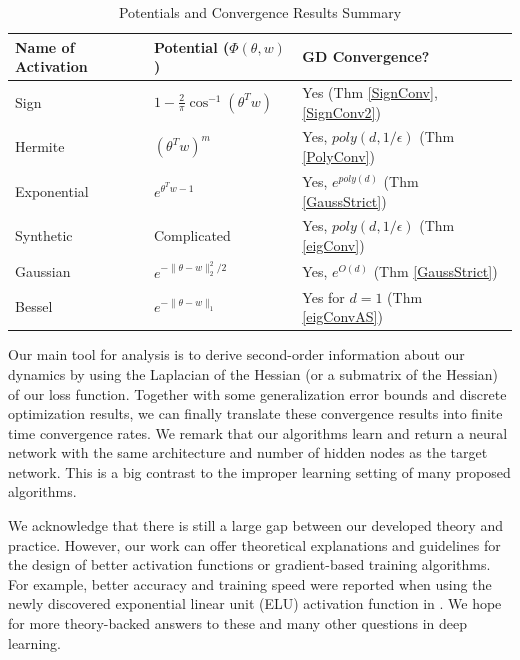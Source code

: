 \documentclass{article}
\begin{document}
\begin{table}[tb]
\caption{Potentials and Convergence Results Summary}
\label{table1}
\noindent
\vskip 0.1in
\begin{center}
\begin{small}
\begin{sc}
\begin{tabular}{
  |p{}%
  |p{}%
  |p{}|%
  }
   \hline 
        Name of Activation&  Potential  ($\Phi(\theta,w)$)    & GD Convergence? \\ \hline 
        Sign & $1 - \frac{2}{\pi}\cos^{-1}(\theta^Tw)$       & Yes (Thm \ref{SignConv}, \ref{SignConv2})\\ 
         Hermite   & $(\theta^Tw)^m$       & Yes, $poly(d,1/\epsilon)$ (Thm \ref{PolyConv}) \\        
        Exponential       & $e^{\theta^Tw-1}$       & Yes, $e^{poly(d)}$ (Thm \ref{GaussStrict}) \\ 
        Synthetic  & Complicated  & Yes, $poly(d,1/\epsilon)$ (Thm \ref{eigConv})\\
        Gaussian  &  $e^{-\|\theta-w\|_2^2/2}$       & Yes, $e^{O(d)}$ (Thm \ref{GaussStrict}) \\
        Bessel    &  $e^{-\|\theta-w\|_1}$        & Yes for $d=1$ (Thm \ref{eigConvAS}) \\   
        \hline
\end{tabular}
\end{sc}
\end{small}
\end{center}
\vskip -0.1in
\end{table} 


Our main tool for analysis is to derive second-order information about our dynamics by using the Laplacian of the Hessian (or a submatrix of the Hessian) of our loss function. Together with some generalization error bounds and discrete optimization results, we can finally translate these convergence results into finite time convergence rates. We remark that our algorithms learn and return a neural network with the same architecture and number of hidden nodes as the target network. This is a big contrast to the improper learning setting of many proposed algorithms. 

We acknowledge that there is still a large gap between our developed theory and practice. However, our work can offer theoretical explanations and guidelines for the design of better activation functions or gradient-based training algorithms. For example, better accuracy and training speed were reported when using the newly discovered exponential linear unit (ELU) activation function in \cite{ClevertUH15} \cite{ShahKSS16}. We hope for more theory-backed answers to these and many other questions in deep learning.
\end{document}
